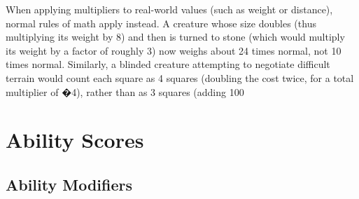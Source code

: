 When applying multipliers to real-world values (such as weight or distance), normal rules of math apply instead. A creature whose size doubles (thus multiplying its weight by 8) and then is turned to stone (which would multiply its weight by a factor of roughly 3) now weighs about 24 times normal, not 10 times normal. Similarly, a blinded creature attempting to negotiate difficult terrain would count each square as 4 squares (doubling the cost twice, for a total multiplier of �4), rather than as 3 squares (adding 100%

\section{Ability Scores}

\subsection{Ability Modifiers}

